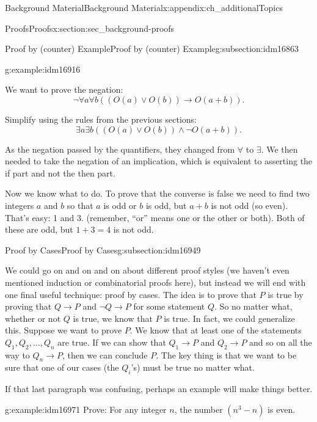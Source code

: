 \documentclass[oneside,10pt,]{book}
\numberwithin{equation}{chapter}
\def\imp{\rightarrow}
\begin{document}
\begin{appendixptx}{Background Material}{}{Background Material}{}{}{x:appendix:ch_additionalTopics}
\begin{sectionptx}{Proofs}{}{Proofs}{}{}{x:section:sec_background-proofs}
\begin{subsectionptx}{Proof by (counter) Example}{}{Proof by (counter) Example}{}{}{g:subsection:idm16863}
\begin{example}{}{g:example:idm16916}
%
\par
We want to prove the negation:%
\begin{equation*}
\neg \forall a \forall b ((O(a) \vee O(b)) \imp O(a+b)).
\end{equation*}
%
\par
Simplify using the rules from the previous sections:%
\begin{equation*}
\exists a \exists b ((O(a) \vee O(b)) \wedge \neg O(a+b)).
\end{equation*}
%
\par
As the negation passed by the quantifiers, they changed from \(\forall\) to \(\exists\). We then needed to take the negation of an implication, which is equivalent to asserting the if part and not the then part.%
\par
Now we know what to do. To prove that the converse is false we need to find two integers \(a\) and \(b\) so that \(a\) is odd or \(b\) is odd, but \(a+b\) is not odd (so even). That's easy: 1 and 3. (remember, ``or'' means one or the other or both). Both of these are odd, but \(1+3 = 4\) is not odd.%
\end{example}
\end{subsectionptx}
%
%
\typeout{************************************************}
\typeout{************************************************}
%
\begin{subsectionptx}{Proof by Cases}{}{Proof by Cases}{}{}{g:subsection:idm16949}
%
\par
We could go on and on and on about different proof styles (we haven't even mentioned induction or combinatorial proofs here), but instead we will end with one final useful technique: proof by cases. The idea is to prove that \(P\) is true by proving that \(Q \imp P\) and \(\neg Q \imp P\) for some statement \(Q\). So no matter what, whether or not \(Q\) is true, we know that \(P\) is true. In fact, we could generalize this. Suppose we want to prove \(P\). We know that at least one of the statements \(Q_1, Q_2, \ldots, Q_n\) are true. If we can show that \(Q_1 \imp P\) and \(Q_2 \imp P\) and so on all the way to \(Q_n \imp P\), then we can conclude \(P\). The key thing is that we want to be sure that one of our cases (the \(Q_i\)'s) must be true no matter what.%
\par
If that last paragraph was confusing, perhaps an example will make things better.%
\begin{example}{}{g:example:idm16971}%
Prove: For any integer \(n\), the number \((n^3 -n)\) is even.%

\end{example}
\end{subsectionptx}
\end{sectionptx}
\end{appendixptx}
\end{document}

